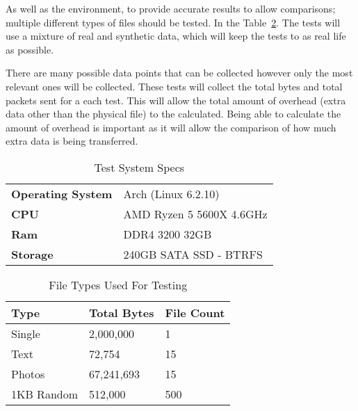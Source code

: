 As well as the environment, to provide accurate results to allow comparisons; multiple different types of files should be tested. In the Table~\ref{tab:file-types-used-for-testing}. The tests will use a mixture of real and synthetic data, which will keep the tests to as real life as possible.

There are many possible data points that can be collected however only the most relevant ones will be collected. These tests will collect the total bytes and total packets sent for a each test. This will allow the total amount of overhead (extra data other than the physical file) to the calculated. Being able to calculate the amount of overhead is important as it will allow the comparison of how much extra data is being transferred.

\begin{table}[h!]
	\caption{Test System Specs}
	\label{tab:test-system-specs}
	\centering
	\begin{tabular}{ l | l | }
		\textbf{Operating System} & Arch (Linux 6.2.10)      \\
		\textbf{CPU}              & AMD Ryzen 5 5600X 4.6GHz \\
		\textbf{Ram}              & DDR4 3200 32GB           \\
		\textbf{Storage}          & 240GB SATA SSD - BTRFS   \\
	\end{tabular}
\end{table}

\begin{table}[h!]
	\caption{File Types Used For Testing}
	\label{tab:file-types-used-for-testing}
	\centering
	\begin{tabular}{ l l l }
		\textbf{Type} & \textbf{Total Bytes} & \textbf{File Count} \\
		\hline
		Single        & 2,000,000            & 1                   \\
		\hline
		Text          & 72,754               & 15                  \\
		\hline
		Photos        & 67,241,693           & 15                  \\
		\hline
		1KB Random    & 512,000              & 500                 \\
		\hline
	\end{tabular}
\end{table}

